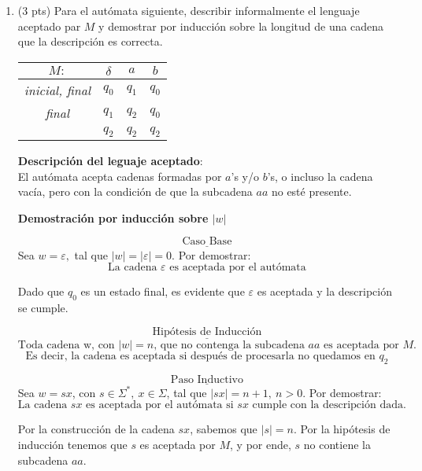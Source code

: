 \documentclass{article}
\begin{document}
\begin{enumerate}
\begin{enumerate}
\begin{center}
        \end{center}
    \end{enumerate}
    \newpage
    \item (3 pts) Para el autómata siguiente, describir informalmente el lenguaje aceptado par $M$ y demostrar por inducción sobre la longitud de una cadena que la descripción es correcta.
    
    \begin{table}[h]
        \centering
        \begin{tabular}{c c| c | c}
            $M:$ & $\delta$ & $a$ & $b$ \\
            \hline
            \textit{inicial, final} & $q_0$ & $q_1$ & $q_0$ \\
            \textit{final} & $q_1$ & $q_2$ & $q_0$ \\
            & $q_2$ & $q_2$ & $q_2$
        \end{tabular}
    \end{table}
    \textbf{Descripción del leguaje aceptado}: \\
    El autómata acepta cadenas formadas por $a$'s y/o $b$'s, o incluso la cadena vacía, pero con la condición de que la subcadena $aa$ no esté presente.
    
    \textbf{Demostración por inducción sobre $|w|$}
    
    $$\underline{\text{Caso Base}}$$  
    Sea $w = \varepsilon,$ tal que $|w| = |\varepsilon| = 0$. Por demostrar: $$\text{La cadena $\varepsilon$ es aceptada por el autómata}$$

    Dado que $q_0$ es un estado final, es evidente que $\varepsilon$ es aceptada y la descripción se cumple.
    
    $$\underline{\text{Hipótesis de Inducción}}$$
    $$\text{Toda cadena w, con $|w| = n$, que no contenga la subcadena $aa$ es aceptada por $M$.}$$
    $$\text{Es decir, la cadena es aceptada si después de procesarla no quedamos en $q_2$}$$
    
    $$\underline{\text{Paso Inductivo}}$$  
    Sea $w = sx$, con $s \in \Sigma^*,~x \in \Sigma$, tal que $|sx| = n + 1,~ n >0$. Por demostrar: $$\text{La cadena $sx$ es aceptada por el autómata si $sx$ cumple con la descripción dada. }$$

    Por la construcción de la cadena $sx$, sabemos que $|s| = n$. Por la hipótesis de inducción tenemos que $s$ es aceptada por $M$, y por ende, $s$ no contiene la subcadena $aa$.
    

\end{enumerate}
\end{document}
